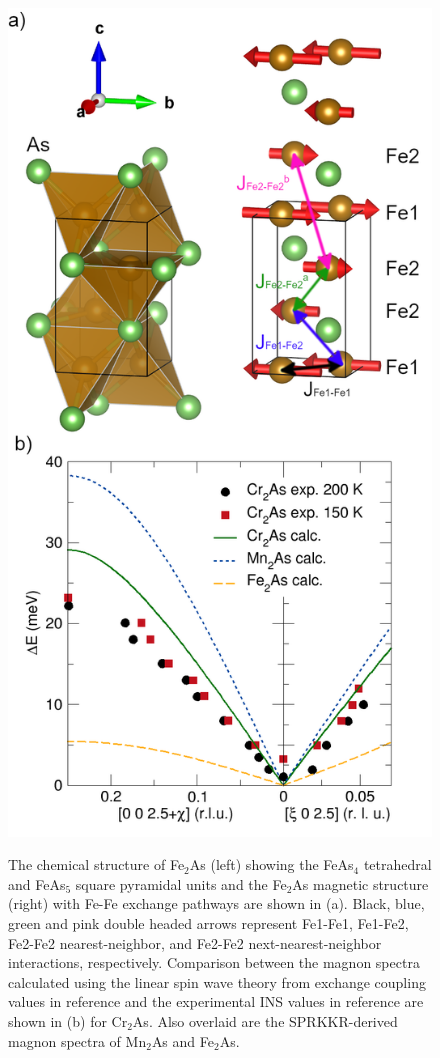 \documentclass[10pt,doublespacing,edeposit]{uiucthesis2020}
\begin{document}
\begin{mainmatter}
\begin{figure}
\centering\includegraphics[width=0.65\columnwidth]{figures/ch8/Cr2As_INS_magnetic_structure.png} \\
\caption{\label{fig:Cr2As_plot}
The chemical structure of Fe$_2$As (left) showing the FeAs$_4$ tetrahedral and FeAs$_5$ square pyramidal units and the Fe$_2$As magnetic structure (right) with Fe-Fe exchange pathways are shown in (a). Black, blue, green and pink double headed arrows represent Fe1-Fe1, Fe1-Fe2, Fe2-Fe2 nearest-neighbor, and Fe2-Fe2 next-nearest-neighbor interactions, respectively. Comparison between the magnon spectra calculated using the linear spin wave theory from exchange coupling values in reference  and the experimental INS values in reference  are shown in (b) for Cr$_2$As. Also overlaid are the SPRKKR-derived magnon spectra of Mn$_2$As and Fe$_2$As.\cite{Zhang2013} 
} 
\end{figure}


\end{mainmatter}
\end{document}
